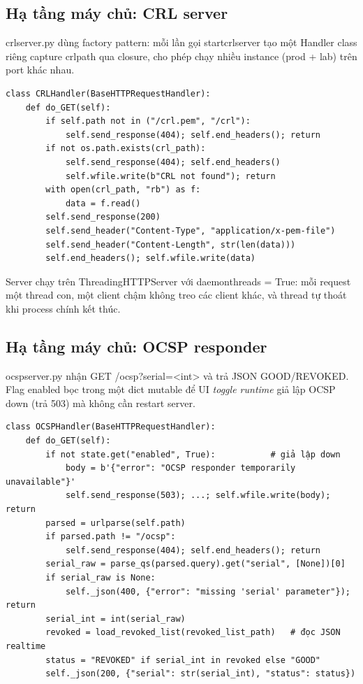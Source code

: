 \documentclass[12pt,a4paper]{article}
\newcommand{\code}[1]{{\ttfamily\small\def\_{\textunderscore\discretionary{}{}{}}#1}}
\begin{document}
\subsection{Hạ tầng máy chủ: CRL server}

\code{crl\_server.py} dùng factory pattern: mỗi lần gọi
\code{start\_crl\_server} tạo một Handler class riêng capture \code{crl\_path}
qua closure, cho phép chạy nhiều instance (prod + lab) trên port khác nhau.

\begin{Verbatim}
class CRLHandler(BaseHTTPRequestHandler):
    def do_GET(self):
        if self.path not in ("/crl.pem", "/crl"):
            self.send_response(404); self.end_headers(); return
        if not os.path.exists(crl_path):
            self.send_response(404); self.end_headers()
            self.wfile.write(b"CRL not found"); return
        with open(crl_path, "rb") as f:
            data = f.read()
        self.send_response(200)
        self.send_header("Content-Type", "application/x-pem-file")
        self.send_header("Content-Length", str(len(data)))
        self.end_headers(); self.wfile.write(data)
\end{Verbatim}

Server chạy trên \code{ThreadingHTTPServer} với \code{daemon\_threads = True}:
mỗi request một thread con, một client chậm không treo các client khác, và
thread tự thoát khi process chính kết thúc.

\subsection{Hạ tầng máy chủ: OCSP responder}

\code{ocsp\_server.py} nhận \code{GET /ocsp?serial=<int>} và trả JSON
\code{GOOD}/\code{REVOKED}. Flag \code{enabled} bọc trong một dict mutable để UI
\emph{toggle runtime} giả lập OCSP down (trả 503) mà không cần restart server.

\begin{Verbatim}
class OCSPHandler(BaseHTTPRequestHandler):
    def do_GET(self):
        if not state.get("enabled", True):           # giả lập down
            body = b'{"error": "OCSP responder temporarily unavailable"}'
            self.send_response(503); ...; self.wfile.write(body); return
        parsed = urlparse(self.path)
        if parsed.path != "/ocsp":
            self.send_response(404); self.end_headers(); return
        serial_raw = parse_qs(parsed.query).get("serial", [None])[0]
        if serial_raw is None:
            self._json(400, {"error": "missing 'serial' parameter"}); return
        serial_int = int(serial_raw)
        revoked = load_revoked_list(revoked_list_path)   # đọc JSON realtime
        status = "REVOKED" if serial_int in revoked else "GOOD"
        self._json(200, {"serial": str(serial_int), "status": status})
\end{Verbatim}
\end{document}
